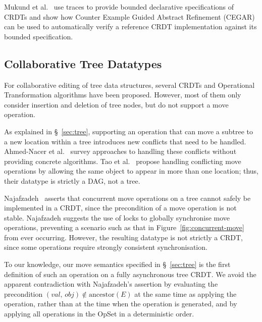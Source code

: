 Mukund et al.~\cite{DBLP:conf/atva/MukundRS15} use traces to provide bounded declarative specifications of CRDTs and show how Counter Example Guided Abstract Refinement (CEGAR) can be used to automatically verify a reference CRDT implementation against its bounded specification.

\subsection{Collaborative Tree Datatypes}

For collaborative editing of tree data structures, several CRDTs \cite{Martin:2010ih,Kleppmann:2016ve} and Operational Transformation algorithms \cite{Jungnickel:2016cb,Ignat:2003jy,Davis:2002iv} have been proposed.
However, most of them only consider insertion and deletion of tree nodes, but do not support a move operation.

As explained in \S~\ref{sec:tree}, supporting an operation that can move a subtree to a new location within a tree introduces new conflicts that need to be handled.
Ahmed-Nacer et al.~\cite{AhmedNacer:2012us} survey approaches to handling these conflicts without providing concrete algorithms.
Tao et al.~\cite{Tao:2015gd} propose handling conflicting move operations by allowing the same object to appear in more than one location; thus, their datatype is strictly a DAG, not a tree.

Najafzadeh~\cite{Najafzadeh:2017vk} asserts that concurrent move operations on a tree cannot safely be implemented in a CRDT, since the precondition of a move operation is not stable.
Najafzadeh suggests the use of locks to globally synchronise move operations, preventing a scenario such as that in Figure~\ref{fig:concurrent-move} from ever occurring.
However, the resulting datatype is not strictly a CRDT, since some operations require strongly consistent synchronisation.

To our knowledge, our move semantics specified in \S~\ref{sec:tree} is the first definition of such an operation on a fully asynchronous tree CRDT.
We avoid the apparent contradiction with Najafzadeh's assertion by evaluating the precondition $(\mathit{val},\, \mathit{obj}) \notin \mathrm{ancestor}(E)$ at the same time as applying the operation, rather than at the time when the operation is generated, and by applying all operations in the OpSet in a deterministic order.
